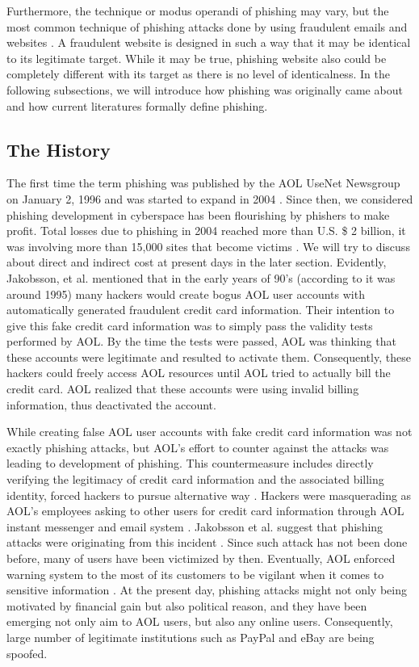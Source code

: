 Furthermore, the technique or modus operandi of phishing may vary,
but the most common technique of phishing attacks done by using fraudulent
emails and websites \citep{james:2005}. A fraudulent website is designed
in such a way that it may be identical to its legitimate target. While
it may be true, phishing website also could be completely different
with its target as there is no level of identicalness. In the following
subsections, we will introduce how phishing was originally came about
and how current literatures formally define phishing.


\subsection{The History }

The first time the term \textquotedbl{}phishing\textquotedbl{} was
published by the \ac{AOL} UseNet Newsgroup on January 2, 1996 and
was started to expand in 2004 \citep{phishorg}. Since then, we considered
phishing development in cyberspace has been flourishing by phishers
to make profit. Total losses due to phishing in 2004 reached more
than U.S. \$ 2 billion, it was involving more than 15,000 sites that
become victims \citep{fellman:2004}. We will try to discuss about
direct and indirect cost at present days in the later section. Evidently,
Jakobsson, et al. \citep{jakobsson:2006} mentioned that in the early
years of 90\textquoteright s (according to \citep{phishorg} it was
around 1995) many hackers would create bogus AOL user accounts with
automatically generated fraudulent credit card information. Their
intention to give this fake credit card information was to simply
pass the validity tests performed by AOL. By the time the tests were
passed, AOL was thinking that these accounts were legitimate and resulted
to activate them. Consequently, these hackers could freely access
AOL resources until AOL tried to actually bill the credit card. AOL
realized that these accounts were using invalid billing information,
thus deactivated the account. 

While creating false AOL user accounts with fake credit card information
was not exactly phishing attacks, but AOL\textquoteright s effort
to counter against the attacks was leading to development of phishing.
This countermeasure includes directly verifying the legitimacy of
credit card information and the associated billing identity, forced
hackers to pursue alternative way \citep{jakobsson:2006}. Hackers
were masquerading as AOL\textquoteright s employees asking to other
users for credit card information through AOL instant messenger and
email system \citep{phishorg}. Jakobsson et al. suggest that phishing
attacks were originating from this incident \citep{jakobsson:2006}.
Since such attack has not been done before, many of users have been
victimized by then. Eventually, AOL enforced warning system to the
most of its customers to be vigilant when it comes to sensitive information
\citep{phishorg}. At the present day, phishing attacks might not
only being motivated by financial gain but also political reason,
and they have been emerging not only aim to AOL users, but also any
online users. Consequently, large number of legitimate institutions
such as PayPal and eBay are being spoofed.


